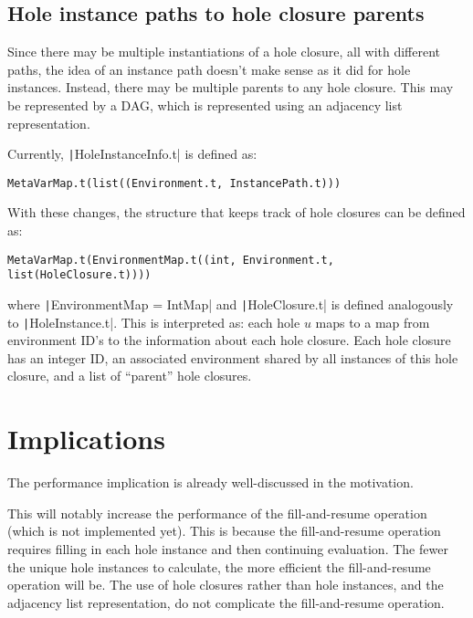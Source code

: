 \documentclass{article}
\begin{document}
\subsection{Hole instance paths to hole closure parents}
Since there may be multiple instantiations of a hole closure, all with different paths, the idea of an instance path doesn't make sense as it did for hole instances. Instead, there may be multiple parents to any hole closure. This may be represented by a DAG, which is represented using an adjacency list representation.

Currently, \texttt|HoleInstanceInfo.t| is defined as:

\begin{verbatim}
MetaVarMap.t(list((Environment.t, InstancePath.t)))
\end{verbatim}
With these changes, the structure that keeps track of hole closures can be defined as:
\begin{verbatim}
MetaVarMap.t(EnvironmentMap.t((int, Environment.t, list(HoleClosure.t))))
\end{verbatim}
where \texttt|EnvironmentMap = IntMap| and \texttt|HoleClosure.t| is defined analogously to \texttt|HoleInstance.t|. This is interpreted as: each hole $u$ maps to a map from environment ID's to the information about each hole closure. Each hole closure has an integer ID, an associated environment shared by all instances of this hole closure, and a list of ``parent'' hole closures.

\section{Implications}
The performance implication is already well-discussed in the motivation.

This will notably increase the performance of the fill-and-resume operation (which is not implemented yet). This is because the fill-and-resume operation requires filling in each hole instance and then continuing evaluation. The fewer the unique hole instances to calculate, the more efficient the fill-and-resume operation will be. The use of hole closures rather than hole instances, and the adjacency list representation, do not complicate the fill-and-resume operation.
\end{document}
